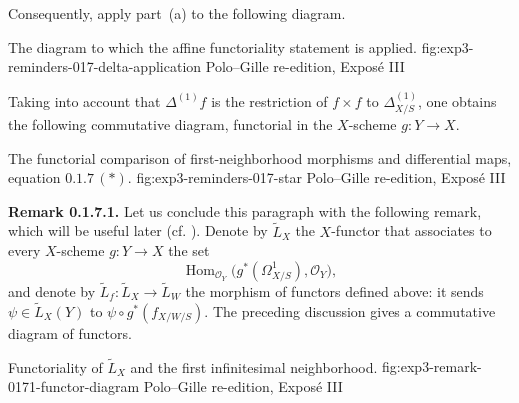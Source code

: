 Consequently, apply part~(a) to the following diagram.

  {The diagram to which the affine functoriality statement is applied.}
  {fig:exp3-reminders-017-delta-application}
  {Polo--Gille re-edition, Expos\'e III}

Taking into account that \(\Delta^{(1)}f\) is the restriction of
\(f\times f\) to \(\Delta^{(1)}_{X/S}\), one obtains the following
commutative diagram, functorial in the \(X\)-scheme \(g:Y\to X\).

  {The functorial comparison of first-neighborhood morphisms and differential maps, equation \(0.1.7\,(*)\).}
  {fig:exp3-reminders-017-star}
  {Polo--Gille re-edition, Expos\'e III}

\medskip
\noindent{}\textbf{Remark 0.1.7.1.}
Let us conclude this paragraph with the following remark, which will be
useful later (cf. ). Denote by \(\widetilde L_X\) the
\(X\)-functor that associates to every \(X\)-scheme \(g:Y\to X\) the
set
\[
 \operatorname{Hom}_{\mathscr O_Y}
 \bigl(g^*(\Omega^1_{X/S}),\mathscr O_Y\bigr),
\]
and denote by \(\widetilde L_f:\widetilde L_X\to\widetilde L_W\) the
morphism of functors defined above: it sends
\(\psi\in\widetilde L_X(Y)\) to
\(\psi\circ g^*(f_{X/W/S})\). The preceding discussion gives a
commutative diagram of functors.

  {Functoriality of \(\widetilde L_X\) and the first infinitesimal neighborhood.}
  {fig:exp3-remark-0171-functor-diagram}
  {Polo--Gille re-edition, Expos\'e III}

